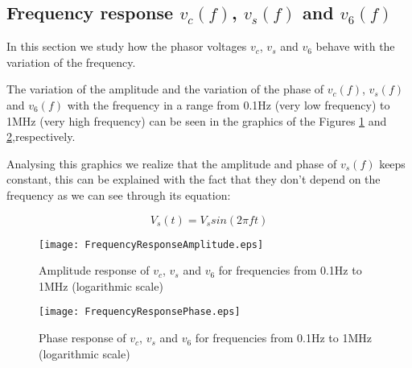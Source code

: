 \subsection{Frequency response $v_c(f)$, $v_s(f)$ and $v_6(f)$}

In this section we study how the phasor voltages $v_c$, $v_s$ and $v_6$ behave with the variation of the frequency. 

The variation of the amplitude and the variation of the phase of $v_c(f)$, $v_s(f)$ and $v_6(f)$ with the frequency in a range from 0.1Hz (very low frequency) to 1MHz (very high frequency) can be seen in the graphics of the Figures \ref{fig:FrequencyResponseAmplitude} and \ref{fig:FrequencyResponsePhase},respectively. 

Analysing this graphics we realize that the amplitude and phase of $v_s(f)$ keeps constant, this can be explained with the fact that they don't depend on the frequency as we can see through its equation:

\begin{equation}
    V_{s}(t) = V_s sin(2 \pi f t)
\end{equation}


\begin{figure}[H] \centering
  \texttt{[image: FrequencyResponseAmplitude.eps]}
  \caption{Amplitude response  of $v_c$, $v_s$ and $v_6$ for frequencies from 0.1Hz to 1MHz (logarithmic scale)}
  \label{fig:FrequencyResponseAmplitude}
\end{figure} 


\begin{figure}[H] \centering
  \texttt{[image: FrequencyResponsePhase.eps]}
  \caption{Phase response of $v_c$, $v_s$ and $v_6$ for frequencies from 0.1Hz to 1MHz (logarithmic scale)}
  \label{fig:FrequencyResponsePhase}
\end{figure} 












